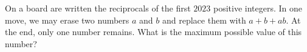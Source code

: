 On a board are written the reciprocals of the first $2023$ positive integers. In one move, we may erase two numbers $a$ and $b$ and replace them with $a+b+ab$. At the end, only one number remains. What is the maximum possible value of this number?
